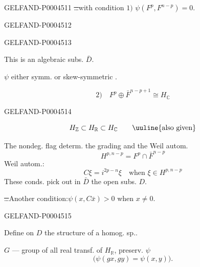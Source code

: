 \begin{GelfandAdjacentEvidence}{GELFAND-P000451}{1}
\sout{\ldots}\quad with condition $1)$ $\psi(F^p,F^{n-p})=0$.
\end{GelfandAdjacentEvidence}
\begin{GelfandAdjacentEvidence}{GELFAND-P000451}{2}

\end{GelfandAdjacentEvidence}
\begin{GelfandAdjacentEvidence}{GELFAND-P000451}{3}


This is an algebraic subs. $\bar D$.

$\psi$ either symm. or skew-symmetric .

\[
2)\quad F^p\oplus\bar F^{n-p+1}\cong H_{\mathbb C}
\]
\end{GelfandAdjacentEvidence}
\begin{GelfandAdjacentEvidence}{GELFAND-P000451}{4}

\[
H_{\mathbb Z}\subset H_{\mathbb R}\subset H_{\mathbb C}
\qquad\mbox{\uuline{also given}}
\]

The nondeg. flag determ. the grading and the Weil autom.
\[
H^{p,n-p}=F^p\cap\bar F^{n-p}
\]
Weil autom.:
\[
C\xi=i^{2p-n}\xi\quad\text{when }\xi\in H^{p,n-p}
\]
These conds. pick out in $\bar D$ the open subs. $D$.

\sout{\ldots}\qquad Another condition:\quad $\psi(x,C\bar x)>0$ when $x\ne0$.
\end{GelfandAdjacentEvidence}
\begin{GelfandAdjacentEvidence}{GELFAND-P000451}{5}


Define on $D$ the structure of a homog. sp..

$G$ — group of all real transf. of $H_{\mathbb R}$, preserv. $\psi$
\[
\bigl(\psi(gx,gy)=\psi(x,y)\bigr).
\]
\end{GelfandAdjacentEvidence}
